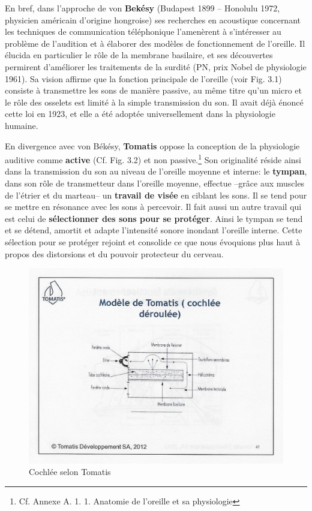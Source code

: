 En bref, dans  l'approche de von \textbf{ Bekésy} (Budapest 1899 -- Honolulu 1972,
physicien américain d'origine hongroise) ses
recherches en acoustique concernant les techniques de communication
téléphonique l'amenèrent à s'intéresser au problème de l'audition et à
élaborer des modèles de fonctionnement de l'oreille. Il élucida en
particulier le rôle de la membrane basilaire, et ses découvertes
permirent d'améliorer les traitements de la surdité (PN, prix
Nobel de physiologie 1961).
Sa vision affirme que la fonction principale de l'oreille (voir
Fig. 3.1)
consiste à transmettre les sons de manière passive, au même titre qu'un micro et le rôle des osselets
est limité à la simple transmission du
son. Il avait déjà énoncé cette loi en 1923, et elle a été adoptée
universellement dans la physiologie humaine.



En divergence avec von Békésy, \textbf{Tomatis} oppose la conception de la
physiologie auditive comme \textbf{active} (Cf. Fig. 3.2) et non
passive.\footnote{Cf. Annexe A. 1. 1. Anatomie de l'oreille et sa physiologie}
Son originalité réside ainsi dans la transmission du son
au niveau de l'oreille moyenne et interne:
le \textbf{tympan}, dans son rôle de transmetteur dans l'oreille
          moyenne, effectue --grâce aux muscles de l'étrier et du marteau--
		un\textbf{ travail de visée} en ciblant les sons. Il
se tend
		pour se mettre en résonance avec les sons à percevoir.
                Il fait aussi un autre travail qui est celui de \textbf{sélectionner des
sons
		pour se protéger}. Ainsi le tympan se tend et se détend,
              amortit et adapte
l'intensité
		sonore inondant  l'oreille interne.
Cette sélection pour se  protéger rejoint et consolide ce que nous évoquions plus haut à propos des 
distorsions et du pouvoir protecteur du cerveau.

    \begin{figure}
    	\centering
    	\includegraphics[width=1.0\linewidth]{images/Cochleederoule_haut.jpg}
    	\caption[Cochlée selon Tomatis]{Cochlée selon Tomatis}
    	\label{fig:cochleederoulehaut}
          \end{figure}

